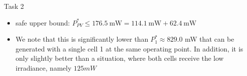 \begin{frame}[allowframebreaks]{Task 2}{}
\begin{solutionnoinc}
\begin{itemize}
      \item safe upper bound: $P_{P V}^* \leq 176.5 \mathrm{~mW}=114.1 \mathrm{~mW}+62.4 \mathrm{~mW}$
      \item We note that this is significantly lower than $P_1^* \approx 829.0$ mW that can be generated with a single cell 1 at the same operating point. In addition, it is only slightly better than a situation, where both cells receive the low irradiance, namely $125 mW$
    \end{itemize}
  \end{solutionnoinc}
\end{frame}
